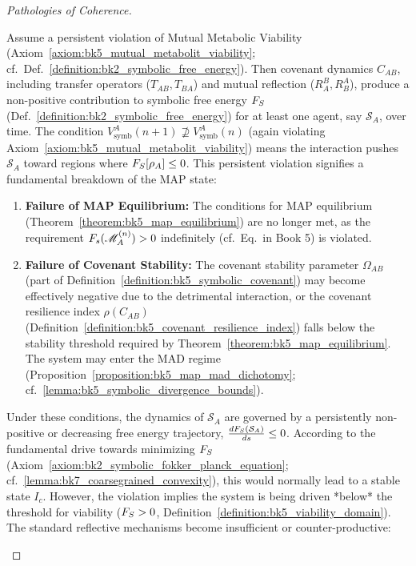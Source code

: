 \begin{proof}[Pathologies of Coherence]
\label{proof:bk9_pathologies_of_coherence}
\leavevmode

Assume a persistent violation of Mutual Metabolic Viability
(Axiom~\ref{axiom:bk5_mutual_metabolit_viability};
cf.~Def.~\ref{definition:bk2_symbolic_free_energy}).
Then covenant dynamics $C_{AB}$, including transfer operators
($T_{AB}, T_{BA}$) and mutual reflection ($R^B_A, R^A_B$), produce a
non-positive contribution to symbolic free energy $F_S$
(Def.~\ref{definition:bk2_symbolic_free_energy}) for at least one agent, say
$\mathcal{S}_A$, over time.
The condition $V^A_{\text{symb}}(n+1) \not\supseteq V^A_{\text{symb}}(n)$
(again violating Axiom~\ref{axiom:bk5_mutual_metabolit_viability}) means the
interaction pushes $\mathcal{S}_A$ toward regions where
$F_S[\rho_A] \le 0$.
This persistent violation signifies a fundamental breakdown of the MAP state:
\begin{enumerate}
    \item \textbf{Failure of MAP Equilibrium:} The conditions for MAP equilibrium (Theorem~\ref{theorem:bk5_map_equilibrium}) are no longer met, as the requirement $F_s(\mathscr{M}_A^{(n)}) > 0$ indefinitely (cf.~Eq.~in Book 5) is violated.
    \item \textbf{Failure of Covenant Stability:} The covenant stability parameter $\Omega_{AB}$ (part of Definition~\ref{definition:bk5_symbolic_covenant}) may become effectively negative due to the detrimental interaction, or the covenant resilience index $\rho(C_{AB})$ (Definition~\ref{definition:bk5_covenant_resilience_index}) falls below the stability threshold required by Theorem~\ref{theorem:bk5_map_equilibrium}. The system may enter the MAD regime (Proposition~\ref{proposition:bk5_map_mad_dichotomy}; cf.~\ref{lemma:bk5_symbolic_divergence_bounds}).
\end{enumerate}
Under these conditions, the dynamics of $\mathcal{S}_A$ are governed by a persistently non-positive or decreasing free energy trajectory, $\frac{dF_S(\mathcal{S}_A)}{ds} \le 0$. According to the fundamental drive towards minimizing $F_S$ (Axiom~\ref{axiom:bk2_symbolic_fokker_planck_equation}; cf.~\ref{lemma:bk7_coarsegrained_convexity}), this would normally lead to a stable state $I_c$. However, the violation implies the system is being driven *below* the threshold for viability ($F_S > 0$, Definition~\ref{definition:bk5_viability_domain}).
The standard reflective mechanisms become insufficient or counter-productive:
\begin{itemize}

\end{itemize}
\end{proof}
